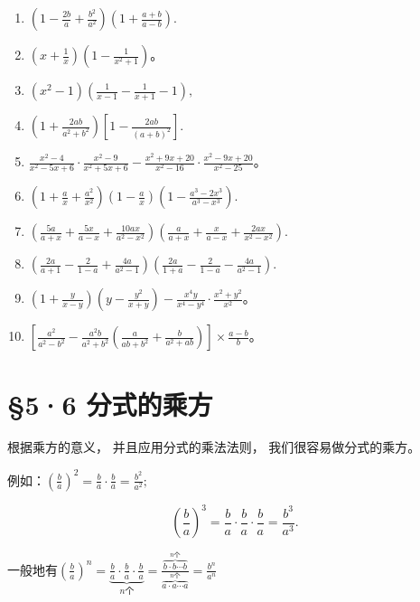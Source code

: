 \begin{enumerate}[start=1]
\item
  \(\left(1 - \frac{2b}{a} +\frac{b^2}{a^2}\right)\left(1 + \frac{a + b}{a - b}\right).\)
\item
  \(\left(x + \frac{1}{x}\right)\left(1 - \frac{1}{x^2 + 1}\right)\)。
\item
  \((x^{2} - 1)\left(\frac{1}{x - 1} -\frac{1}{x + 1} -1\right),\)
\item
  \(\left(1 + \frac{2ab}{a^2 + b^2}\right)\left[1 - \frac{2ab}{(a + b)^2}\right].\)
\item
  \(\frac{x^2 - 4}{x^2 - 5x + 6} \cdot \frac{x^2 - 9}{x^2 + 5x + 6} - \frac{x^2 + 9x + 20}{x^2 - 16} \cdot \frac{x^2 - 9x + 20}{x^2 - 25}\)。
\item
  \(\left(1 + \frac{a}{x} +\frac{a^2}{x^2}\right)\left(1 - \frac{a}{x}\right)\left(1 - \frac{a^3 - 2x^3}{a^3 - x^3}\right).\)
\item
  \(\left(\frac{5a}{a + x} +\frac{5x}{a - x} +\frac{10ax}{a^2 - x^2}\right)\left(\frac{a}{a + x} +\frac{x}{a - x} +\frac{2ax}{x^2 - x^2}\right).\)
\item
  \(\left(\frac{2a}{a + 1} -\frac{2}{1 - a} +\frac{4a}{a^2 - 1}\right)\left(\frac{2a}{1 + a} -\frac{2}{1 - a} -\frac{4a}{a^2 - 1}\right).\)
\item
  \(\left(1 + \frac{y}{x - y}\right)\left(y - \frac{y^2}{x + y}\right) - \frac{x^4y}{x^4 - y^4} \cdot \frac{x^2 + y^2}{x^2}\)。
\item
  \(\left[\frac{a^2}{a^2 - b^2} - \frac{a^2b}{a^2 + b^2}\left(\frac{a}{ab + b^2} + \frac{b}{a^2 + ab}\right)\right] \times \frac{a - b}{b}\)。
\end{enumerate}

\section{§5·6 分式的乘方}

根据乘方的意义， 并且应用分式的乘法法则， 我们很容易做分式的乘方。

例如：\(\left(\frac{b}{a}\right)^2 = \frac{b}{a}\cdot \frac{b}{a} = \frac{b^2}{a^2};\)

\[
\left(\frac{b}{a}\right) ^{3} = \frac{b}{a} \cdot \frac{b}{a} \cdot \frac{b}{a} = \frac{b ^{3}}{a ^{3}}.
\]

一般地有\(\left(\frac{b}{a}\right)^{n}=\underbrace{\frac{b}{a}\cdot\frac{b}{a}\cdot\frac{b}{a}}_{n\text{个}}=\frac{\overbrace{b\cdot b\cdots b}^{n\text{个}}}{\overbrace{a\cdot a\cdots a}^{n\text{个}}}=\frac{b^{n}}{a^{n}}\)

